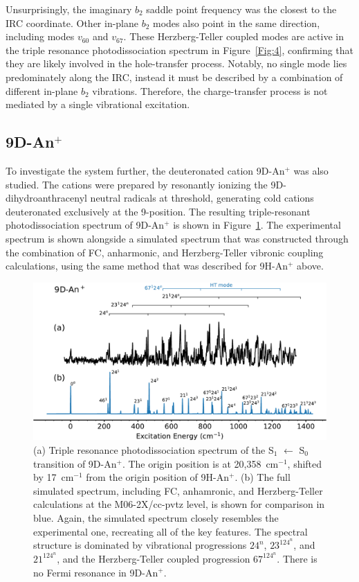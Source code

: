\documentclass[journal=jpcafh,manuscript=article,layout=onecolumn, 12pt]{achemso}
\begin{document}
Unsurprisingly, the imaginary $b_2$ saddle point frequency was the closest to the IRC coordinate. Other in-plane $b_2$ modes also point in the same direction, including modes $v_{60}$ and $v_{67}$. These Herzberg-Teller coupled modes are active in the triple resonance photodissociation spectrum in Figure~\ref{Fig:4}, confirming that they are likely involved in the hole-transfer process. %
Notably, no single mode lies predominately along the IRC, instead it must be described by a combination of different in-plane $b_2$ vibrations. Therefore, the charge-transfer process is not mediated by a single vibrational excitation.

\subsection{9D-An$^+$}
To investigate the system further, the deuteronated cation 9D-An$^+$ was also studied. The cations were prepared by resonantly ionizing the 9D-dihydroanthracenyl neutral radicals at threshold, generating cold cations deuteronated exclusively at the 9-position. The resulting triple-resonant photodissociation spectrum of 9D-An$^+$ is shown in Figure~\ref{Fig:6}. The experimental spectrum is shown alongside a simulated spectrum that was constructed through the combination of FC, anharmonic, and Herzberg-Teller vibronic coupling calculations, using the same method that was described for 9H-An$^+$ above.

\begin{figure} [h]
	\includegraphics[width=1\textwidth]{figures/M9D-An+sw}
	\caption{(a) Triple resonance photodissociation spectrum of the S$_1$ $\leftarrow$ S$_0$  transition of 9D-An$^+$. The origin position is at 20,358~cm$^{-1}$, shifted by 17~cm$^{-1}$ from the origin position of 9H-An$^+$. (b) The full simulated spectrum, including FC, anhamronic, and Herzberg-Teller calculations at the M06-2X/cc-pvtz level, is shown for comparison in blue. Again, the simulated spectrum closely resembles the experimental one, recreating all of the key features. The spectral structure is dominated by vibrational progressions $24^n$, $23^124^n$, and $21^124^n$, and the Herzberg-Teller coupled progression $67^124^n$. There is no Fermi resonance in 9D-An$^+$. }
	\label{Fig:6}
\end{figure}
\end{document}
